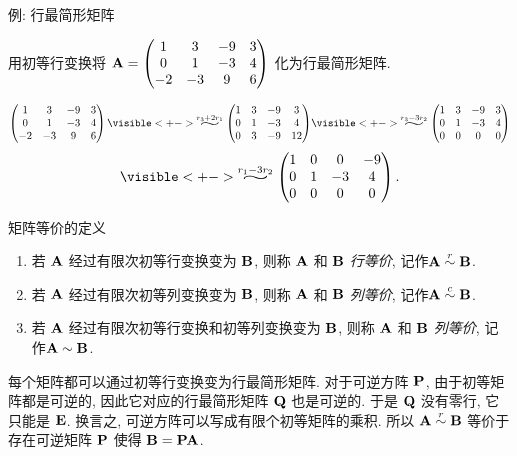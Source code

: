 \begin{frame}{例: 行最简形矩阵}
	\onslide<+->
	\begin{example}
		用初等行变换将 ${\mathbf{A}}=\begin{pmatrix}
			1&3&-9&3\\
			0&1&-3&4\\
			-2&-3&9&6
		\end{pmatrix}$ 化为行最简形矩阵.
	\end{example}
	\onslide<+->
	\begin{solution}
		\[\begin{pmatrix}
			1&3&-9&3\\
			0&1&-3&4\\
			-2&-3&9&6
		\end{pmatrix}
		\visible<+->{\wsim{r_3+2r_1}{}\begin{pmatrix}
			1&3&-9&3\\
			0&1&-3&4\\
			0&3&-9&12
		\end{pmatrix}}
		\visible<+->{\wsim{
			r_3-3r_2}{}\begin{pmatrix}
				1&3&-9&3\\
				0&1&-3&4\\
				0&0&0&0
		\end{pmatrix}}\]\[
		\visible<+->{\wsim{
			r_1-3r_2}{}\begin{pmatrix}
				1&0&0&-9\\
				0&1&-3&4\\
				0&0&0&0
		\end{pmatrix}.}
		\]
	\end{solution}
\end{frame}


\begin{frame}{矩阵等价的定义}
	\onslide<+->
	\begin{definition}
		\begin{enumerate}
			\item 若 ${\mathbf{A}}$ 经过有限次初等行变换变为 ${\mathbf{B}}$, 则称 ${\mathbf{A}}$ 和 ${\mathbf{B}}$ \emph{行等价}, 记作\emph{${\mathbf{A}}\mathrel{\overset{r}{\sim}}{\mathbf{B}}$}.
			\item 若 ${\mathbf{A}}$ 经过有限次初等列变换变为 ${\mathbf{B}}$, 则称 ${\mathbf{A}}$ 和 ${\mathbf{B}}$ \emph{列等价}, 记作\emph{${\mathbf{A}}\mathrel{\overset{c}{\sim}}{\mathbf{B}}$}.
			\item 若 ${\mathbf{A}}$ 经过有限次初等行变换和初等列变换变为 ${\mathbf{B}}$, 则称 ${\mathbf{A}}$ 和 ${\mathbf{B}}$ \emph{列等价}, 记作\emph{${\mathbf{A}}\sim{\mathbf{B}}$}.
		\end{enumerate}
	\end{definition}
	\onslide<+->
	每个矩阵都可以通过初等行变换变为行最简形矩阵.
	\onslide<+->
	对于可逆方阵 ${\mathbf{P}}$, 由于初等矩阵都是可逆的, 因此它对应的行最简形矩阵 ${\mathbf{Q}}$ 也是可逆的.
	\onslide<+->
	于是 ${\mathbf{Q}}$ 没有零行, 它只能是 ${\mathbf{E}}$.
	\onslide<+->
	换言之, \alert{可逆方阵可以写成有限个初等矩阵的乘积}.
	\onslide<+->
	所以 ${\mathbf{A}}\mathrel{\overset{r}{\sim}}{\mathbf{B}}$ 等价于存在可逆矩阵 ${\mathbf{P}}$ 使得 ${\mathbf{B}}={\mathbf{P}}{\mathbf{A}}$.
\end{frame}


